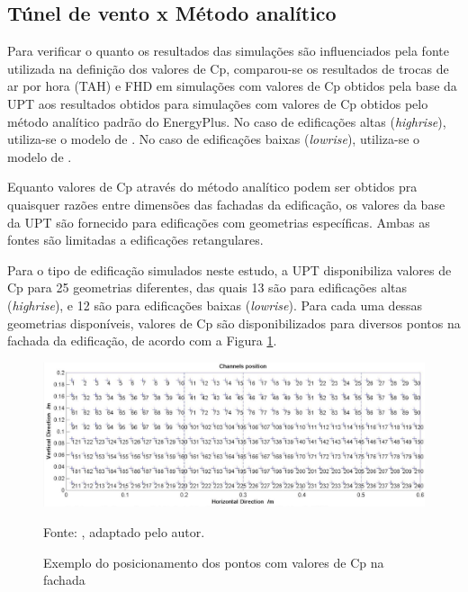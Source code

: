 \documentclass[brazil,hardcopy,openany,a5paper]{ufscthesis}
\begin{document}
		
		\subsection{Túnel de vento x Método analítico}
		
		Para verificar o quanto os resultados das simulações são influenciados pela fonte utilizada na definição dos valores de Cp, comparou-se os resultados de trocas de ar por hora (TAH) e FHD em simulações com valores de Cp obtidos pela base da UPT aos resultados obtidos para simulações com valores de Cp obtidos pelo método analítico padrão do EnergyPlus.
		No caso de edificações altas (\textit{highrise}), utiliza-se o modelo de  \cite{Atkins}. No caso de edificações baixas (\textit{lowrise}), utiliza-se o modelo de  \cite{SwamiChandra}.
		
		Equanto valores de Cp através do método analítico podem ser obtidos pra quaisquer razões entre dimensões das fachadas da edificação, os valores da base da UPT são fornecido para edificações com geometrias específicas. Ambas as fontes são limitadas a edificações retangulares.
		
		Para o tipo de edificação simulados neste estudo, a UPT disponibiliza valores de Cp para 25 geometrias diferentes, das quais 13 são para edificações altas (\textit{highrise}), e 12 são para edificações baixas (\textit{lowrise}). Para cada uma dessas geometrias disponíveis, valores de Cp são disponibilizados para diversos pontos na fachada da edificação, de acordo com a Figura \ref{fig:tpupoints}.
		
		\begin{figure}[h]
			\centering
			\caption{Exemplo do posicionamento dos pontos com valores de Cp na fachada}
			\includegraphics[width=1\linewidth]{img/tpu_points.png}
			\label{fig:tpupoints}
			\begin{flushleft}
				Fonte:  \cite{TPU2018}, adaptado pelo autor.
			\end{flushleft}
		\end{figure}
		
\end{document}
